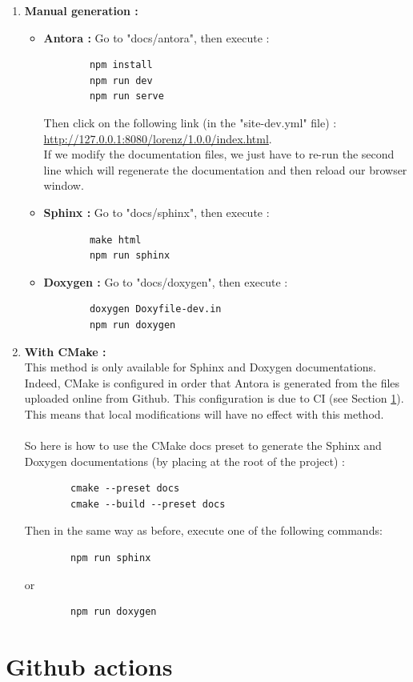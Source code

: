 	\begin{enumerate}[label=\textbullet]
		\item \textbf{Manual generation :} 
		\begin{itemize}[label=-]
			\item \textbf{Antora :} Go to "docs/antora", then execute :
\begin{lstlisting}
		npm install
		npm run dev
		npm run serve
\end{lstlisting}
			Then click on the following link (in the "site-dev.yml" file) : \\ \url{http://127.0.0.1:8080/lorenz/1.0.0/index.html}. \\
			If we modify the documentation files, we just have to re-run the second line which will regenerate the documentation and then reload our browser window.
			\item \textbf{Sphinx :} Go to "docs/sphinx", then execute :
\begin{lstlisting}
		make html
		npm run sphinx
\end{lstlisting}
			\item \textbf{Doxygen :} Go to "docs/doxygen", then execute :
\begin{lstlisting}
		doxygen Doxyfile-dev.in
		npm run doxygen
\end{lstlisting}
		\end{itemize}
		\newpage
		\item \textbf{With CMake :} \\
		\danger This method is only available for Sphinx and Doxygen documentations. Indeed, CMake is configured in order that Antora is generated from the files uploaded online from Github. This configuration is due to CI (see Section \ref{ci}). This means that local modifications will have no effect with this method. \\ \; \\
		So here is how to use the CMake docs preset to generate the Sphinx and Doxygen documentations (by placing at the root of the project) :
\begin{lstlisting}
		cmake --preset docs
		cmake --build --preset docs
\end{lstlisting}
		Then in the same way as before, execute one of the following commands:
\begin{lstlisting}
		npm run sphinx
\end{lstlisting}
		or
\begin{lstlisting}
		npm run doxygen
\end{lstlisting}
	\end{enumerate}

\newpage

\section{Github actions}
\label{ci}